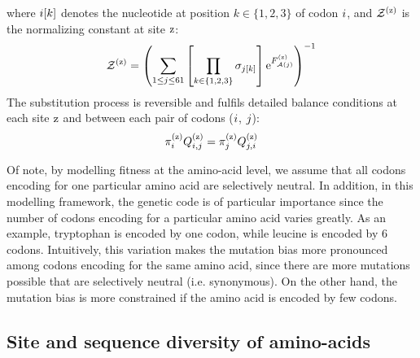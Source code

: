 where ${i}[k]$ denotes the nucleotide at position $k \in \{ 1, 2, 3 \}$ of codon ${i}$, and $\mathcal{Z}^{(\text{z})} $ is the normalizing constant at site $\text{z}$:
\begin{align}
    \mathcal{Z}^{(\text{z})} = \left( \sum\limits_{1 \leq {j} \leq 61} \left[\prod\limits_{k \in \{ 1, 2, 3 \}} \sigma_{{j}[k]}\right] \text{e}^{F_{\mathcal{A}({j})}^{(\text{z})}} \right)^{-1}
\end{align}
The substitution process is reversible and fulfils detailed balance conditions at each site $\text{z}$ and between each pair of codons (${i}$, ${j}$):
\begin{align}
    \pi_{{i}}^{(\text{z})} Q_{{i}, {j}}^{(\text{z})} = \pi_{{j}}^{(\text{z})} Q_{{j}, {i}}^{(\text{z})}
    \label{codonSubBalance}
\end{align}

Of note, by modelling fitness at the amino-acid level, we assume that all codons encoding for one particular amino acid are selectively neutral.
In addition, in this modelling framework, the genetic code is of particular importance since the number of codons encoding for a particular amino acid varies greatly.
As an example, tryptophan is encoded by one codon, while leucine is encoded by 6 codons.
Intuitively, this variation makes the mutation bias more pronounced among codons encoding for the same amino acid, since there are more mutations possible that are selectively neutral (i.e. synonymous).
On the other hand, the mutation bias is more constrained if the amino acid is encoded by few codons.

\subsection{Site and sequence diversity of amino-acids}
\label{subsec:entropy}

